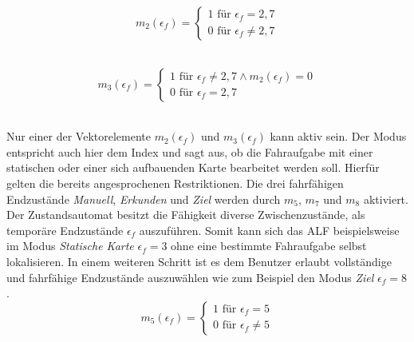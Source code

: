 		\begin{figure}[H]
			\centering
			\begin{minipage}[b]{0.4\textwidth}
				\begin{equation}
					m_2(\epsilon_f)=\left\{\begin{array}{ll} 1 \text{ für } \epsilon_f=2,7 \\
					0 \text{ für }\epsilon_f\neq 2,7\end{array}\right. 
					\label{eq: m2}
				\end{equation}\\
			\end{minipage}
			\hfill
			\begin{minipage}[b]{0.55\textwidth}
				\begin{equation}
					m_3(\epsilon_f)=\left\{\begin{array}{ll} 1 \text{ für } \epsilon_f\neq2,7 \wedge m_2(\epsilon_f) = 0 \\
					0 \text{ für }\epsilon_f= 2,7\end{array}\right.
					\label{eq: m3}
				\end{equation}\\
			\end{minipage}
		\end{figure}
		
		Nur einer der Vektorelemente $m_2(\epsilon_f)$ und $m_3(\epsilon_f)$ kann aktiv sein. Der Modus entspricht auch hier dem Index und sagt aus, ob die Fahraufgabe mit einer statischen oder einer sich aufbauenden Karte bearbeitet werden soll. Hierfür gelten die bereits angesprochenen Restriktionen. Die drei fahrfähigen Endzustände \textit{Manuell}, \textit{Erkunden} und \textit{Ziel} werden durch $m_5$, $m_7$ und $m_8$ aktiviert. Der Zustandsautomat besitzt die Fähigkeit diverse Zwischenzustände, als temporäre Endzustände $\epsilon_f$ auszuführen. Somit kann sich das ALF beispielsweise im Modus \textit{Statische Karte} $\epsilon_f=3$ ohne eine bestimmte Fahraufgabe selbst lokalisieren. In einem weiteren Schritt ist es dem Benutzer erlaubt vollständige und fahrfähige Endzustände auszuwählen wie zum Beispiel den Modus \textit{Ziel} $\epsilon_f=8$.\\
		
		
				\begin{equation}
					m_5(\epsilon_f)=\left\{\begin{array}{ll} 1 \text{ für } \epsilon_f=5 \\
						0 \text{ für }\epsilon_f\neq 5\end{array}\right. 
					\label{eq: m5}
				\end{equation}\\
			
